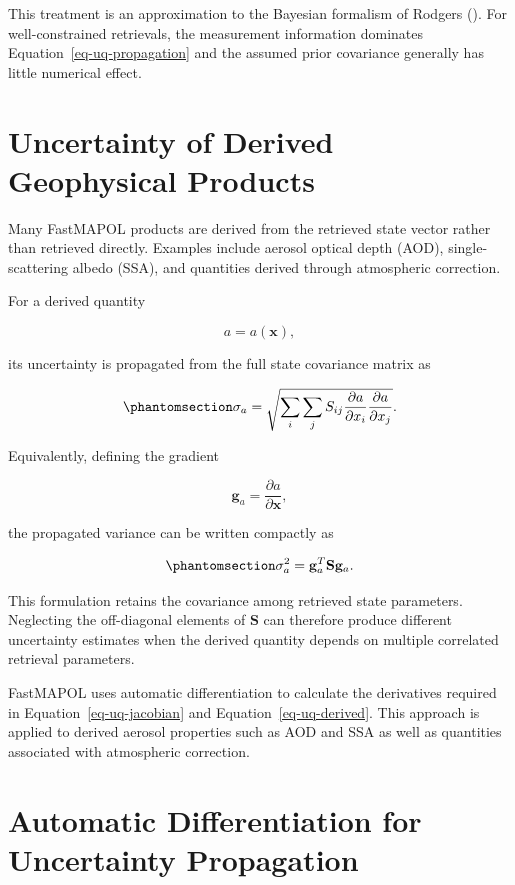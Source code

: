 \documentclass[
  11pt,
  letterpaper,
]{scrreprt}
\begin{document}
This treatment is an approximation to the Bayesian formalism of Rodgers
(). For well-constrained retrievals,
the measurement information dominates Equation~\ref{eq-uq-propagation}
and the assumed prior covariance generally has little numerical effect.

\section{Uncertainty of Derived Geophysical
Products}\label{uncertainty-of-derived-geophysical-products}

Many FastMAPOL products are derived from the retrieved state vector
rather than retrieved directly. Examples include aerosol optical depth
(AOD), single-scattering albedo (SSA), and quantities derived through
atmospheric correction.

For a derived quantity

\[
a=a(\mathbf{x}),
\]

its uncertainty is propagated from the full state covariance matrix as

\begin{equation}\phantomsection\label{eq-uq-derived}{
\sigma_a
=
\sqrt{
\sum_i
\sum_j
S_{ij}
\frac{\partial a}{\partial x_i}
\frac{\partial a}{\partial x_j}
}.
}\end{equation}

Equivalently, defining the gradient

\[
\mathbf{g}_a
=
\frac{\partial a}{\partial\mathbf{x}},
\]

the propagated variance can be written compactly as

\begin{equation}\phantomsection\label{eq-uq-derived-matrix}{
\sigma_a^2
=
\mathbf{g}_a^T
\mathbf{S}
\mathbf{g}_a.
}\end{equation}

This formulation retains the covariance among retrieved state
parameters. Neglecting the off-diagonal elements of \(\mathbf{S}\) can
therefore produce different uncertainty estimates when the derived
quantity depends on multiple correlated retrieval parameters.

FastMAPOL uses automatic differentiation to calculate the derivatives
required in Equation~\ref{eq-uq-jacobian} and
Equation~\ref{eq-uq-derived}. This approach is applied to derived
aerosol properties such as AOD and SSA as well as quantities associated
with atmospheric correction.

\section{Automatic Differentiation for Uncertainty
Propagation}\label{automatic-differentiation-for-uncertainty-propagation}
\end{document}
